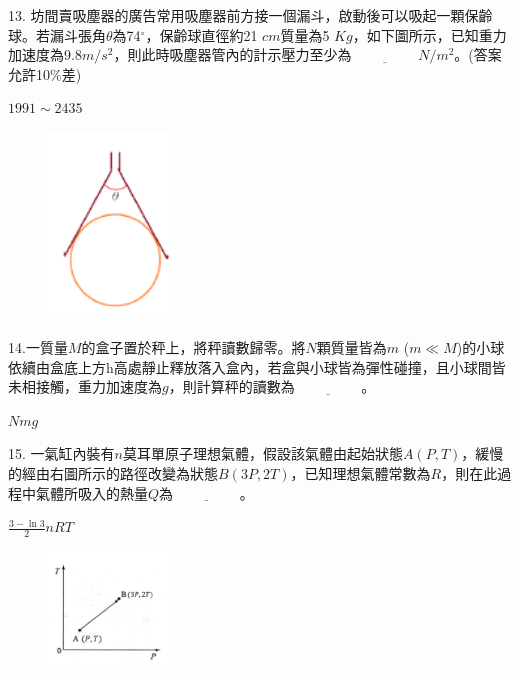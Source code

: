 \documentclass[cn,10pt,math=newtx,chinesefont=founder,device=ig]{elegantbook}
\begin{document}
\begin{example}
   13. 坊間賣吸塵器的廣告常用吸塵器前方接一個漏斗，啟動後可以吸起一顆保齡球。若漏斗張角$\theta$為74$^\circ$，保齡球直徑約21 $cm$質量為5 $Kg$，如下圖所示，已知重力加速度為9.8$m/s^2$，則此時吸塵器管內的計示壓力至少為$\underline{\hspace{2cm}} N/m^2$。(答案允許10$\%$差)\\
    \rightline{[桃園高中教甄109]}
\end{example}
\begin{solution}
    $1991\sim2435$
\end{solution}
\begin{figure}[htbp]
    \flushright
    \includegraphics[width=0.3\textwidth]{image/109桃園13.png}
  \end{figure}
\newpage


\begin{example}
   14.一質量$M$的盒子置於秤上，將秤讀數歸零。將$N$顆質量皆為$m$ ($m\ll M$)的小球依續由盒底上方h高處靜止釋放落入盒內，若盒與小球皆為彈性碰撞，且小球間皆未相接觸，重力加速度為$g$，則計算秤的讀數為$\underline{\hspace{2cm}}$。\\
    \rightline{[桃園高中教甄109]}
\end{example}
\begin{solution}
    $Nmg$
\end{solution}

\newpage


\begin{example}
   15. 一氣缸內裝有$n$莫耳單原子理想氣體，假設該氣體由起始狀態$A(P,T)$，緩慢的經由右圖所示的路徑改變為狀態$B(3P,2T)$，已知理想氣體常數為$R$，則在此過程中氣體所吸入的熱量$Q$為$\underline{\hspace{2cm}}$。\\
    \rightline{[桃園高中教甄109]}
\end{example}
\begin{solution}
    $\frac{3-\ln{3}}{2} nRT$
\end{solution}
\begin{figure}[htbp]
    \flushright
    \includegraphics[width=0.3\textwidth]{image/109桃園15.png}
  \end{figure}
\newpage
\end{document}
